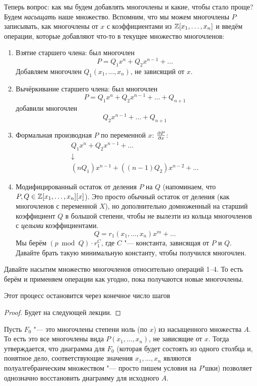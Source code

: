 	Теперь вопрос: как мы будем добавлять многочлены и какие, чтобы стало проще?
	Будем \textit{насыщать} наше множество.
	Вспомним, что мы можем многочлены $P$ записывать, как многочлены от $x$ с коэффициентами из $\mathbb{Z}[x_1, \dots, x_n]$ и
	введём операции, которые добавляют что-то в текущее множество многочленов:
	\begin{enumerate}
	\item
		Взятие старшего члена: был многочлен
		\[ P = Q_1x^n + Q_2x^{n-1} + \dots \]
		Добавляем многочлен $Q_1(x_1, \dots, x_n)$, не зависящий от $x$.
	\item
		Вычёркивание старшего члена: был многочлен
		\[ P = Q_1 x^n + Q_2 x^{n-1} + \dots + Q_{n+1} \]
		добавили многочлен
		\[ Q_2 x^{n-1} + \dots + Q_{n+1} \]
	\item
		Формальная производная $P$ по переменной $x$: $\frac{\partial P}{\partial x}$:
		\begin{gather*}
		Q_1x^n + Q_2x^{n-1} + \dots \\
		\downarrow \\
		(nQ_1)x^{n-1} + ((n-1)Q_2)x^{n-2} + \dots
		\end{gather*}
	\item
		Модифицированный остаток от деления $P$ на $Q$ (напоминаем, что $P, Q \in \mathbb{Z}[x_1, \dots, x_n][x]$).
		Это просто обычный остаток от деления (как многочленов с переменной $X$), но дополнительно домноженный на старший коэффициент $Q$ в большой степени,
		чтобы не вылезти из кольца многочленов с \textsl{целыми} коэффициентами.
		\[ Q = r_1(x_1, \dots, x_n) x^m + \dots \]
		Мы берём $(p \bmod Q) \cdot r_1 ^ C$, где $C$ "--- константа, зависящая от $P$ и $Q$.
		Давайте брать такую минимальную константу, чтобы получился многочлен.
	\end{enumerate}
	Давайте насытим множество многочленов относительно операций 1--4.
	То есть берём и применяем операции как угодно, пока получаются новые многочлены.
	\begin{assertion}
		Этот процесс остановится через конечное число шагов
	\end{assertion}
	\begin{proof}
		Будет на следующей лекции.
		\TODO
	\end{proof}

	Пусть $F_0$ "--- это многочлены степени ноль (по $x$) из насыщенного множества $A$.
	То есть это все многочлены вида $P(x_1, \dots, x_n)$, не зависящие от $x$.
	Тогда утверждается, что диаграмма для $F_0$ (которая будет состоять из одного столбца и, понятное дело,
	соответствующие значения $x_1, \dots, x_n$ являются полуалгебраическим множеством "--- просто пишем условия на $P$'шки)
	позволяет однозначно восстановить диаграмму для исходного $A$.

